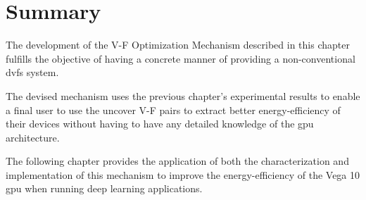 \section{Summary}

The development of the V-F Optimization Mechanism described in this chapter fulfills the objective of having a concrete manner of providing a non-conventional \acrshort{dvfs} system.

The devised mechanism uses the previous chapter's experimental results to enable a final user to use the uncover V-F pairs to extract better energy-efficiency of their devices without having to have any detailed knowledge of the \acrshort{gpu} architecture.

The following chapter provides the application of both the characterization and implementation of this mechanism to improve the energy-efficiency of the Vega 10 \acrshort{gpu} when running deep learning applications.